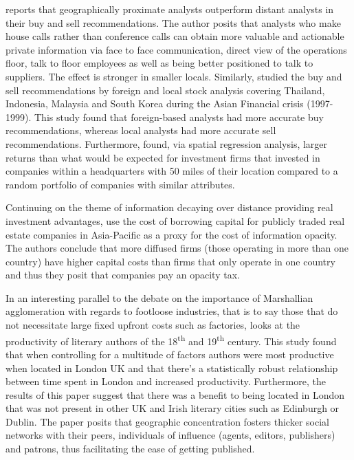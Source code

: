 \cite{malloythe2005} reports that geographically proximate analysts outperform distant analysts in their buy and sell recommendations. The author posits that analysts who make house calls rather than conference calls can obtain more valuable and actionable private information via face to face communication, direct view of the operations floor, talk to floor employees as well as being better positioned to talk to suppliers.  The effect is stronger in smaller locals.  Similarly, \cite{Farooq2013} studied the buy and sell recommendations by foreign and local stock analysis covering Thailand, Indonesia, Malaysia and South Korea during the Asian Financial crisis (1997-1999).  This study found that foreign-based analysts had more accurate buy recommendations, whereas local analysts had more accurate sell recommendations.  Furthermore, \cite{Eckel2011} found, via spatial regression analysis, larger returns than what would be expected for investment firms that invested in companies within a headquarters with 50 miles of their location compared to a random portfolio of companies with similar attributes.  
	
Continuing on the theme of information decaying over distance providing real investment advantages,	\cite{Cashman2017} use the cost of borrowing capital for publicly traded real estate companies in Asia-Pacific as a proxy for the cost of information opacity. The authors conclude that more diffused firms (those operating in more than one country) have higher capital costs than firms that only operate in one country and thus they posit that companies pay an opacity tax.   

In an interesting parallel to the debate on the importance of Marshallian agglomeration with regards to footloose industries, that is to say those that do not necessitate large fixed upfront costs such as factories, \cite{Mitchell_London_2019} looks at the productivity of literary authors of the 18\textsuperscript{th} and 19\textsuperscript{th} century. This study found that when controlling for a multitude of factors authors were most productive when located in London UK and that there's a statistically robust relationship between time spent in London and increased productivity.  Furthermore, the results of this paper suggest that there was a benefit to being located in London that was not present in other UK and Irish literary cities such as Edinburgh or Dublin.  The paper posits that geographic concentration fosters thicker social networks with their peers, individuals of influence (agents, editors, publishers) and patrons, thus facilitating the ease of getting published. 	
	
